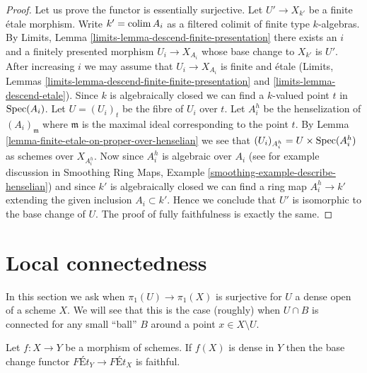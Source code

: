 \begin{proof}
Let us prove the functor is essentially surjective.
Let $U' \to X_{k'}$ be a finite \'etale morphism.
Write $k' = \mathop{\mathrm{colim}}\nolimits A_i$ as a filtered colimit of finite type $k$-algebras.
By Limits, Lemma \ref{limits-lemma-descend-finite-presentation}
there exists an $i$ and a finitely presented morphism $U_i \to X_{A_i}$
whose base change to $X_{k'}$ is $U'$. After increasing $i$
we may assume that $U_i \to X_{A_i}$ is finite and \'etale
(Limits, Lemmas \ref{limits-lemma-descend-finite-finite-presentation} and
\ref{limits-lemma-descend-etale}).
Since $k$ is algebraically closed we can find a
$k$-valued point $t$ in $\mathop{\mathrm{Spec}}(A_i)$. Let $U = (U_i)_t$ be the
fibre of $U_i$ over $t$. Let $A_i^h$ be the
henselization of $(A_i)_{\mathfrak m}$ where $\mathfrak m$ is
the maximal ideal corresponding to the point $t$. By
Lemma \ref{lemma-finite-etale-on-proper-over-henselian}
we see that $(U_i)_{A_i^h} = U \times \mathop{\mathrm{Spec}}(A_i^h)$ as schemes
over $X_{A_i^h}$. Now since
$A_i^h$ is algebraic over $A_i$ (see for example discussion in
Smoothing Ring Maps, Example \ref{smoothing-example-describe-henselian})
and since $k'$ is algebraically closed
we can find a ring map $A_i^h \to k'$ extending the given
inclusion $A_i \subset k'$. Hence we conclude that $U'$
is isomorphic to the base change of $U$.
The proof of fully faithfulness is exactly the same.
\end{proof}








\section{Local connectedness}
\label{section-unibranch}

\noindent
In this section we ask when $\pi_1(U) \to \pi_1(X)$ is surjective
for $U$ a dense open of a scheme $X$. We will see that this is the
case (roughly) when $U \cap B$ is connected for any small
``ball'' $B$ around a point $x \in X \setminus U$.

\begin{lemma}
\label{lemma-dense-faithful}
Let $f : X \to Y$ be a morphism of schemes. If $f(X)$ is dense in $Y$
then the base change functor $\textit{F\'Et}_Y \to \textit{F\'Et}_X$
is faithful.
\end{lemma}

